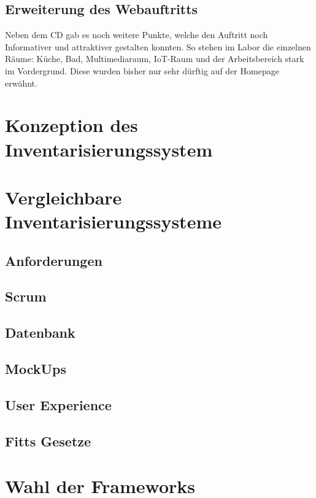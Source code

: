 \subsection{Erweiterung des Webauftritts}
Neben dem \acf{CD} gab es noch weitere Punkte, welche den Auftritt noch Informativer und attraktiver gestalten konnten. So stehen im Labor die einzelnen Räume: Küche, Bad, Multimediaraum, IoT-Raum und der Arbeitsbereich stark im Vordergrund. Diese wurden bisher nur sehr dürftig auf der Homepage erwähnt.

\section{Konzeption des Inventarisierungssystem}
\label{inventar}


\section{Vergleichbare Inventarisierungssysteme}

\subsection{Anforderungen}


\subsection{Scrum}

\subsection{Datenbank}

\subsection{MockUps}

\subsection{User Experience}

\subsection{Fitts Gesetze}

\section{Wahl der Frameworks}
